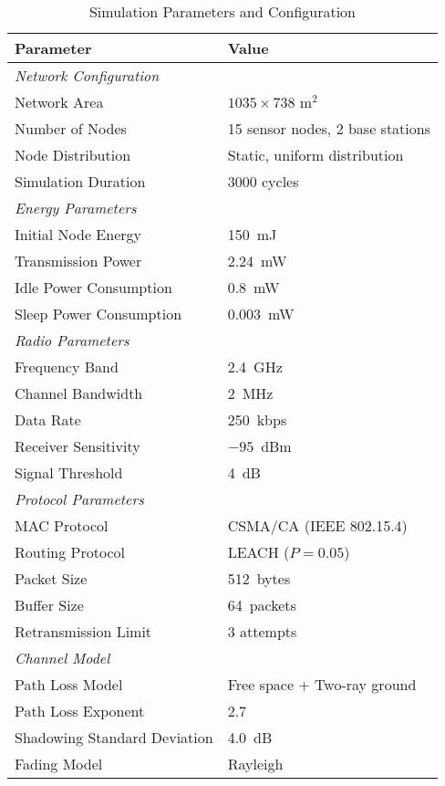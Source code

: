 \documentclass[conference]{IEEEtran}
\begin{document}
\begin{table}[h!]
\caption{Simulation Parameters and Configuration}
\label{table:sim_params}
\centering
\begin{tabular}{|l|l|}
\hline
\textbf{Parameter} & \textbf{Value} \\
\hline
\multicolumn{2}{|l|}{\textit{Network Configuration}} \\
\hline
Network Area & $1035 \times 738$ m$^2$ \\
Number of Nodes & 15 sensor nodes, 2 base stations \\
Node Distribution & Static, uniform distribution \\
Simulation Duration & 3000 cycles \\
\hline
\multicolumn{2}{|l|}{\textit{Energy Parameters}} \\
\hline
Initial Node Energy & 150~mJ \\
Transmission Power & 2.24~mW \\
Idle Power Consumption & 0.8~mW \\
Sleep Power Consumption & 0.003~mW \\
\hline
\multicolumn{2}{|l|}{\textit{Radio Parameters}} \\
\hline
Frequency Band & 2.4~GHz \\
Channel Bandwidth & 2~MHz \\
Data Rate & 250~kbps \\
Receiver Sensitivity & $-95$~dBm \\
Signal Threshold & 4~dB \\
\hline
\multicolumn{2}{|l|}{\textit{Protocol Parameters}} \\
\hline
MAC Protocol & CSMA/CA (IEEE 802.15.4) \\
Routing Protocol & LEACH ($P = 0.05$) \\
Packet Size & 512~bytes \\
Buffer Size & 64~packets \\
Retransmission Limit & 3 attempts \\
\hline
\multicolumn{2}{|l|}{\textit{Channel Model}} \\
\hline
Path Loss Model & Free space + Two-ray ground \\
Path Loss Exponent & 2.7 \\
Shadowing Standard Deviation & 4.0~dB \\
Fading Model & Rayleigh \\
\hline
\end{tabular}
\end{table}
\end{document}

